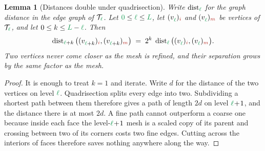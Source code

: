 \documentclass[a4paper, 12pt]{article}
\newcommand{\green}{\color{ForestGreen}}
\newcommand{\brickred}{\color{BrickRed}}
\newcommand{\T}{\mathcal{T}}
\newcommand{\vertex}[2]{\freeQ{v}{}{#1}{#2}}
\newcommand{\dist}[1]{\operatorname{dist}_{#1}}
\newcommand{\coarseIdxone}{{\brickred i}}
\newcommand{\coarseIdxtwo}{{\brickred m}}
\renewcommand{\l}{{\green\ell}}
\renewcommand{\L}{{\green L}}
\newcommand{\lzero}{{\green 0}}
\newcommand{\freeQ}[4]{ ( {#1}^{#2}_{#3} )_{#4}}
\newtheorem{lemma}[theorem]{Lemma}
\theoremstyle{definition}
\theoremstyle{plain}
\numberwithin{equation}{section}
\begin{document}
\begin{lemma}[Distances double under quadrisection]
    \label{lemma:distance_doubling}
    Write $\dist{\l}$ for the graph distance in the edge graph of $\T_\l$. Let $\lzero \leq \l \leq \L$, let $\vertex{\l}{\coarseIdxone}$ and $\vertex{\l}{\coarseIdxtwo}$ be vertices of $\T_\l$, and let $0 \leq k \leq \L - \l$. Then
    \begin{equation}
        \label{eq:distance_doubling}
        \dist{\l+k} \big( \vertex{\l+k}{\coarseIdxone}, \vertex{\l+k}{\coarseIdxtwo} \big) \; = \; 2^k \; \dist{\l} \big( \vertex{\l}{\coarseIdxone}, \vertex{\l}{\coarseIdxtwo} \big) .
    \end{equation}
    Two vertices never come closer as the mesh is refined, and their separation grows by the same factor as the mesh.
\end{lemma}
\begin{proof}
    It is enough to treat $k = 1$ and iterate. Write $d$ for the distance of the two vertices on level $\l$. Quadrisection splits every edge into two. Subdividing a shortest path between them therefore gives a path of length $2d$ on level $\l \! + \! 1$, and the distance there is at most $2d$. A fine path cannot outperform a coarse one because inside each face the level-$\l \! + \! 1$ mesh is a scaled copy of its parent and crossing between two of its corners costs two fine edges. Cutting across the interiors of faces therefore saves nothing anywhere along the way.
\end{proof}
\end{document}
